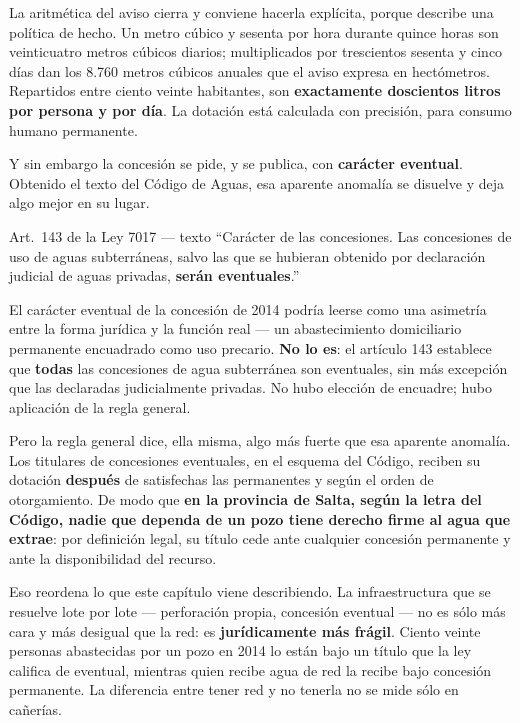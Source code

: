 \begin{cautela}
La aritmética del aviso cierra y conviene hacerla explícita, porque describe una política de hecho. Un metro cúbico y sesenta por hora durante quince horas son veinticuatro metros cúbicos diarios; multiplicados por trescientos sesenta y cinco días dan los 8.760 metros cúbicos anuales que el aviso expresa en hectómetros. Repartidos entre ciento veinte habitantes, son \textbf{exactamente doscientos litros por persona y por día}. La dotación está calculada con precisión, para consumo humano permanente.

Y sin embargo la concesión se pide, y se publica, con \textbf{carácter eventual}. Obtenido el texto del Código de Aguas, esa aparente anomalía se disuelve y deja algo mejor en su lugar.
\end{cautela}

\begin{ficha}{Art.\ 143 de la Ley 7017 --- texto}
``Carácter de las concesiones. Las concesiones de uso de aguas subterráneas, salvo las que se hubieran obtenido por declaración judicial de aguas privadas, \textbf{serán eventuales}.''
\end{ficha}

\begin{cautela}
El carácter eventual de la concesión de 2014 podría leerse como una asimetría entre la forma jurídica y la función real --- un abastecimiento domiciliario permanente encuadrado como uso precario. \textbf{No lo es}: el artículo 143 establece que \textbf{todas} las concesiones de agua subterránea son eventuales, sin más excepción que las declaradas judicialmente privadas. No hubo elección de encuadre; hubo aplicación de la regla general.

Pero la regla general dice, ella misma, algo más fuerte que esa aparente anomalía. Los titulares de concesiones eventuales, en el esquema del Código, reciben su dotación \textbf{después} de satisfechas las permanentes y según el orden de otorgamiento. De modo que \textbf{en la provincia de Salta, según la letra del Código, nadie que dependa de un pozo tiene derecho firme al agua que extrae}: por definición legal, su título cede ante cualquier concesión permanente y ante la disponibilidad del recurso.

Eso reordena lo que este capítulo viene describiendo. La infraestructura que se resuelve lote por lote --- perforación propia, concesión eventual --- no es sólo más cara y más desigual que la red: es \textbf{jurídicamente más frágil}. Ciento veinte personas abastecidas por un pozo en 2014 lo están bajo un título que la ley califica de eventual, mientras quien recibe agua de red la recibe bajo concesión permanente. La diferencia entre tener red y no tenerla no se mide sólo en cañerías.
\end{cautela}

